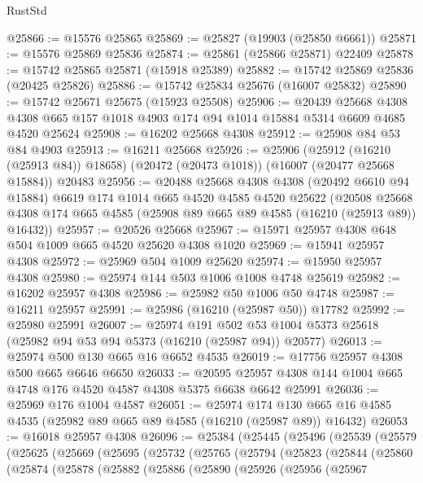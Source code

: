 \begin{lexlean}{RustStd}
\begin{coremodule}
@25866 := @15576 @25865
@25869 := @25827 (@19903 (@25850 @6661))
@25871 := @15576 @25869 @25836
@25874 := @25861 (@25866 @25871) @22409
@25878 := @15742 @25865 @25871 (@15918 @25389)
@25882 := @15742 @25869 @25836 (@20425 @25826)
@25886 := @15742 @25834 @25676 (@16007 @25832)
@25890 := @15742 @25671 @25675 (@15923 @25508)
@25906 := @20439
    @25668
    @4308
    @4308
    @665
    @157
    @1018
    @4903
    @174
    @94
    @1014
    @15884
    @5314
    @6609
    @4685
    @4520
    @25624
@25908 := @16202 @25668 @4308
@25912 := @25908 @84 @53 @84 @4903
@25913 := @16211 @25668
@25926 := @25906
    (@25912 (@16210 (@25913 @84)) @18658)
    (@20472 (@20473 @1018))
    (@16007 (@20477 @25668 @15884))
    @20483
@25956 := @20488
    @25668
    @4308
    @4308
    (@20492 @6610 @94 @15884)
    @6619
    @174
    @1014
    @665
    @4520
    @4585
    @4520
    @25622
    (@20508 @25668 @4308 @174 @665 @4585 (@25908 @89 @665 @89 @4585 (@16210 (@25913 @89)) @16432))
@25957 := @20526 @25668
@25967 := @15971 @25957 @4308 @648 @504 @1009 @665 @4520 @25620 @4308 @1020
@25969 := @15941 @25957 @4308
@25972 := @25969 @504 @1009 @25620
@25974 := @15950 @25957 @4308
@25980 := @25974 @144 @503 @1006 @1008 @4748 @25619
@25982 := @16202 @25957 @4308
@25986 := @25982 @50 @1006 @50 @4748
@25987 := @16211 @25957
@25991 := @25986 (@16210 (@25987 @50)) @17782
@25992 := @25980 @25991
@26007 := @25974
    @191
    @502
    @53
    @1004
    @5373
    @25618
    (@25982 @94 @53 @94 @5373 (@16210 (@25987 @94)) @20577)
@26013 := @25974 @500 @130 @665 @16 @6652 @4535
@26019 := @17756 @25957 @4308 @500 @665 @6646 @6650
@26033 := @20595 @25957 @4308 @144 @1004 @665 @4748 @176 @4520 @4587 @4308 @5375 @6638 @6642 @25991
@26036 := @25969 @176 @1004 @4587
@26051 := @25974
    @174
    @130
    @665
    @16
    @4585
    @4535
    (@25982 @89 @665 @89 @4585 (@16210 (@25987 @89)) @16432)
@26053 := @16018 @25957 @4308
@26096 := @25384
    (@25445
      (@25496
        (@25539
          (@25579
            (@25625
              (@25669
                (@25695
                  (@25732
                    (@25765
                      (@25794
                        (@25823
                          (@25844
                            (@25860
                              (@25874
                                (@25878
                                  (@25882
                                    (@25886
                                      (@25890
                                        (@25926
                                          (@25956
                                            (@25967

\end{coremodule}
\end{lexlean}
